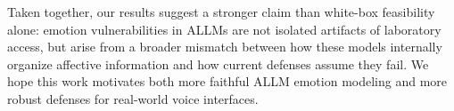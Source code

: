 Taken together, our results suggest a stronger claim than white-box feasibility alone:
emotion vulnerabilities in ALLMs are not isolated artifacts of laboratory access, but arise from a broader mismatch between how these models internally organize affective information and how current defenses assume they fail.
We hope this work motivates both more faithful ALLM emotion modeling and more robust defenses for real-world voice interfaces.
